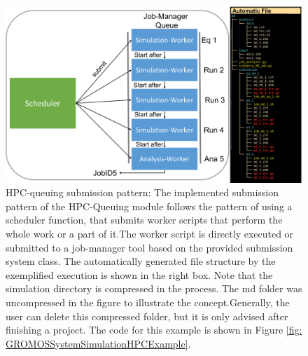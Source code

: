 \begin{figure}[h]
    \centering
    \includegraphics[width=\textwidth]{fig/implementation/SimulationExecutionManagment.png}
    \caption{HPC-queuing submission pattern: The implemented submission pattern of the HPC-Queuing module follows the pattern of using a scheduler function, that submits worker scripts that perform the whole work or a part of it.The worker script is directly executed or submitted to a job-manager tool based on the provided submission system class. The automatically generated file structure by the exemplified execution is shown in the right box. Note that the simulation directory is compressed in the process. The md folder was uncompressed in the figure to illustrate the concept.Generally, the user can delete this compressed folder, but it is only advised after finishing a project. The code for this example is shown in Figure \ref{fig: GROMOSSystemSimulationHPCExample}. }
    \label{fig: SimulationExecPattern}
\end{figure}

